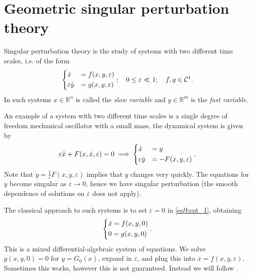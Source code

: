 \section{Geometric singular perturbation theory}
Singular perturbation theory is the study of systems with two different time scales, i.e. of the form
\begin{align}
	\begin{dcases}
		\dot{x} &= f(x,y,\varepsilon) \\
		\varepsilon \dot{y} &= g(x,y,\varepsilon)
	\end{dcases}
	;\quad 0 \leq \varepsilon \ll 1; \quad f,g \in \mathcal{C}^{1}. \label{eq9:spt_1}
\end{align}
In such systems $x \in \mathbb{R}^{n}$ is called the \emph{slow variable} and $y \in \mathbb{R}^{m}$ is the \emph{fast variable}.
\begin{ex}
	An example of a system with two different time scales is a single degree of freedom mechanical oscillator with a small mass, the dynamical system is given by
	\begin{align}
		\varepsilon \ddot{x} + F(x, \dot{x}, \varepsilon) = 0 \implies
		\begin{dcases}
			\dot{x} &=y \\
			\varepsilon \dot{y} &= - F(x,y, \varepsilon)
		\end{dcases}
		.
	\end{align}
	Note that $\dot{y} = \frac{1}{ \varepsilon}F(x,y,\varepsilon)$ implies that $y$ changes very quickly. The equations for $\dot{y}$ become singular as $\varepsilon \to 0$, hence we have singular perturbation (the smooth dependence of solutions on $\varepsilon$ does not apply).
\end{ex}

The classical approach to such systems is to set $\varepsilon =0 $ in \eqref{eq9:spt_1}, obtaining
\begin{align}
	\begin{dcases}
		\dot{x} = f(x,y, 0) \\
		0 = g(x,y,0)
	\end{dcases}
	.
\end{align}
This is a mixed differential-algebraic system of equations. We solve $g (x,y,0)=0$ for $y=G_{0}(x)$, expand in $\varepsilon$, and plug this into $\dot{x}=f(x,y,\varepsilon)$. Sometimes this works, however this is not guaranteed. Instead we will follow \cite{Fenichel1979}.

